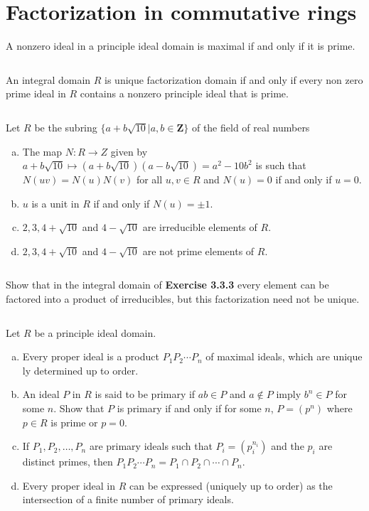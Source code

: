 \section{Factorization in commutative rings}
\begin{ex}
    A nonzero ideal in a principle ideal domain is maximal if and only if it is prime.
\end{ex}

$$ $$

\begin{ex}
    An integral domain $R$ is unique factorization domain if and only if every non zero prime ideal in $R$ contains a nonzero principle ideal that is prime.
\end{ex}

$$ $$

\begin{ex}
    Let $R$ be the subring $\{a+b\sqrt{10}|a,b\in \mathbf{Z}\}$ of the field of real numbers
    \begin{enumerate}[(a)]
        \item The map $N:R\to Z$ given by $a+b\sqrt{10}\mapsto (a+b\sqrt{10})(a-b\sqrt{10})=a^{2}-10b^{2}$ is such that $N(uv)=N(u)N(v)$ for all $u,v\in R$ and $N(u)=0$ if and only if $u=0$.
        \item $u$ is a unit in $R$ if and only if $N(u)=\pm 1$.
        \item $2,3,4+\sqrt{10}$ and $4-\sqrt{10}$ are irreducible elements of $R$.
        \item $2,3,4+\sqrt{10}$ and $4-\sqrt{10}$ are not prime elements of $R$.
    \end{enumerate}
\end{ex}

$$ $$

\begin{ex}
    Show that in the integral domain of \textbf{Exercise 3.3.3} every element can be factored into a product of irreducibles, but this factorization need not be unique.
\end{ex}

$$ $$

\begin{ex}
    Let $R$ be a principle ideal domain.
    \begin{enumerate}[(a)]
        \item Every proper ideal is a product $P_{1}P_{2}\cdots P_{n}$ of maximal ideals, which are unique ly determined up to order.
        \item An ideal $P$ in $R$ is said to be primary if $ab\in P$ and $a\notin P$ imply $b^{n}\in P$ for some $n$. Show that $P$ is primary if and only if for some $n$, $P=(p^{n})$ where $p\in R$ is prime or $p=0$.
        \item If $P_{1}, P_{2},\dots, P_{n}$ are primary ideals such that $P_{i}=(p_{i}^{n_{i}})$ and the $p_{i}$ are distinct primes, then $P_{1}P_{2}\cdots P_{n}=P_{1}\cap P_{2}\cap \cdots\cap P_{n}$.
        \item Every proper ideal in $R$ can be expressed (uniquely up to order) as the intersection of a finite number of primary ideals.
    \end{enumerate}
\end{ex}

